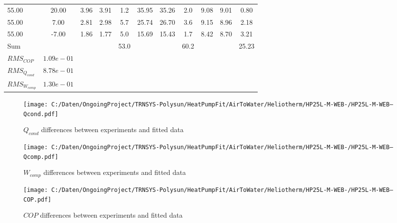 \documentclass[english]{SPFShortReport}
\begin{document}
\begin{table}[!ht]
\begin{small}
\begin{center}
{\begin{tabular}{l | c c c c c c c c c c }
55.00  & 20.00 & 3.96 & 3.91 & 1.2 & 35.95 & 35.26 & 2.0 & 9.08 & 9.01 & 0.80\\ 
55.00  & 7.00 & 2.81 & 2.98 & 5.7 & 25.74 & 26.70 & 3.6 & 9.15 & 8.96 & 2.18\\ 
55.00  & -7.00 & 1.86 & 1.77 & 5.0 & 15.69 & 15.43 & 1.7 & 8.42 & 8.70 & 3.21\\ 
\hline 
 Sum &  & &  & 53.0 &  &  & 60.2 & &  & 25.23\\ 
\hline 
 $RMS_{COP}$ & $1.09e-01$ \\ 
 $RMS_{Q_{cond}}$ & $8.78e-01$ \\ 
 $RMS_{W_{comp}}$ & $1.30e-01$ \\ 
\hline
\hline
\end{tabular}
}
\label{ErrorsTable}
\end{center}
\end{small}
\end{table}
\begin{figure}[!ht]
\begin{center}
\texttt{[image: C:/Daten/OngoingProject/TRNSYS-Polysun/HeatPumpFit/AirToWater/Heliotherm/HP25L-M-WEB-/HP25L-M-WEB--Qcond.pdf]}
\caption{$Q_{cond}$ differences between experiments and fitted data}
\label{QcongFig}
\end{center}
\end{figure}
\begin{figure}[!ht]
\begin{center}
\texttt{[image: C:/Daten/OngoingProject/TRNSYS-Polysun/HeatPumpFit/AirToWater/Heliotherm/HP25L-M-WEB-/HP25L-M-WEB--Qcomp.pdf]}
\caption{$W_{comp}$ differences between experiments and fitted data}
\label{QcompFig}
\end{center}
\end{figure}
\begin{figure}[!ht]
\begin{center}
\texttt{[image: C:/Daten/OngoingProject/TRNSYS-Polysun/HeatPumpFit/AirToWater/Heliotherm/HP25L-M-WEB-/HP25L-M-WEB--COP.pdf]}
\caption{$COP$ differences between experiments and fitted data}
\label{COPFig}
\end{center}
\end{figure}
\end{document}
